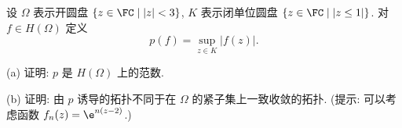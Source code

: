 
\setcounter{exer}{4}
\begin{exercise}
    设 $\varOmega$ 表示开圆盘 $\{z\in\FC\mid |z|<3\}$, $K$ 表示闭单位圆盘 $\{z\in\FC\mid |z\leq 1|\}$.
    对 $f\in H(\varOmega)$ 定义
    \[p(f)=\sup_{z\in K}|f(z)|.\]

    (a) 证明: $p$ 是 $H(\varOmega)$ 上的范数.

    (b) 证明: 由 $p$ 诱导的拓扑不同于在 $\varOmega$ 的紧子集上一致收敛的拓扑.
    (提示: 可以考虑函数 $f_n(z)=\e^{n(z-2)}$.)
\end{exercise}

